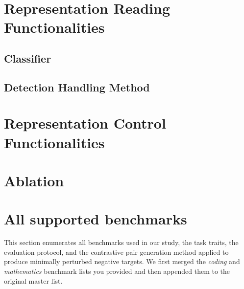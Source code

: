 \documentclass{article}
\begin{document}
\section{Representation Reading Functionalities}

\subsection{Classifier}

\subsection{Detection Handling Method}

\section{Representation Control Functionalities}


\section{Ablation}

\appendix

\section{All supported benchmarks}

This section enumerates all benchmarks used in our study, the task traits, the evaluation protocol, and the contrastive pair generation method applied to produce minimally perturbed negative targets. We first merged the \emph{coding} and \emph{mathematics} benchmark lists you provided and then appended them to the original master list.

\end{document}
